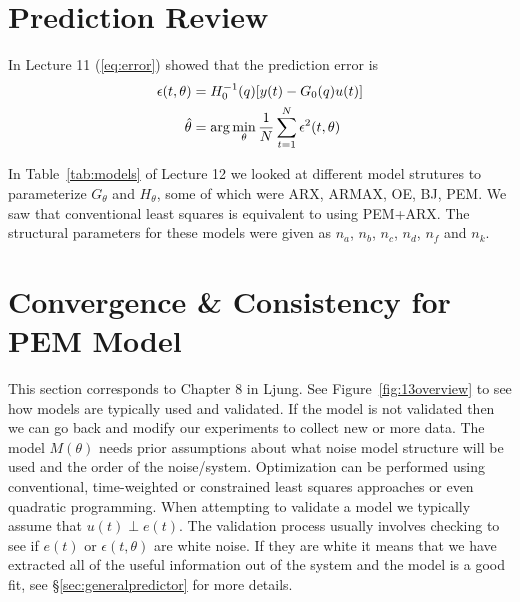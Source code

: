 \mainmatter%
\setcounter{page}{1}

\lectureseries[\course]{\course}

\date{November 10, 2009}

\setaddress%

\setcounter{lecture}{12}
\setcounter{chapter}{12}


\section{Prediction Review}
In Lecture 11 (\ref{eq:error}) showed that the prediction error is
\begin{align*}
\epsilon(t,\theta) &= H_0^{-1}(q)[y(t)-G_0(q)u(t)] \\
\hat{\theta} &= \arg\min_\theta\frac{1}{N}\sum_{t=1}^N\epsilon^2(t,\theta)
\end{align*}

In Table~\ref{tab:models} of Lecture 12 we looked at different model strutures to parameterize $G_\theta$ and $H_\theta$, some of which were ARX, ARMAX, OE, BJ, PEM\@.
We saw that conventional least squares is equivalent to using PEM+ARX\@.
The structural parameters for these models were given as $n_a$, $n_b$, $n_c$, $n_d$, $n_f$ and $n_k$.

\section{Convergence \& Consistency for PEM Model}%
\label{sec:13convergence}
This section corresponds to Chapter 8 in Ljung.
See Figure~\ref{fig:13overview} to see how models are typically used and validated.
If the model is not validated then we can go back and modify our experiments to collect new or more data.
The model $M(\theta)$ needs prior assumptions about what noise model structure will be used and the order of the noise/system.
Optimization can be performed using conventional, time-weighted or constrained least squares approaches or even quadratic programming.
When attempting to validate a model we typically assume that $u(t)\perp e(t)$.
The validation process usually involves checking to see if $e(t)$ or $\epsilon(t,\theta)$ are white noise.
If they are white it means that we have extracted all of the useful information out of the system and the model is a good fit, see \S\ref{sec:generalpredictor} for more details.

